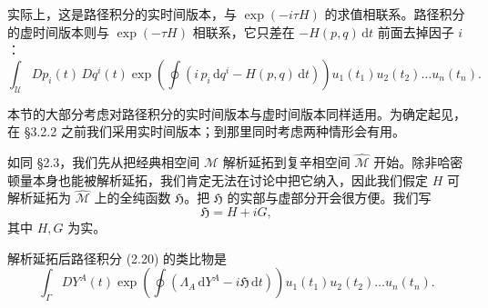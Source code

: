 \documentclass[11pt,a4paper,UTF8]{ctexart}
\theoremstyle{plain}
\theoremstyle{definition}
\begin{document}

实际上，这是路径积分的实时间版本，与 $\exp(-i\tau H)$ 的求值相联系。路径积分的虚时间版本则与 $\exp(-\tau H)$ 相联系，它只差在 $-\!H(p,q)\,\mathrm{d}t$ 前面去掉因子 $i$：
\begin{equation}
    \int_{\mathcal{U}} Dp_i(t)\,Dq^i(t)\exp\left(\oint\left(i\,p_i\,\mathrm{d}q^i-H(p,q)\,\mathrm{d}t\right)\right)u_1(t_1)u_2(t_2)\dots u_n(t_n).
    \tag{3.2}
\end{equation}

本节的大部分考虑对路径积分的实时间版本与虚时间版本同样适用。为确定起见，在 §3.2.2 之前我们采用实时间版本；到那里同时考虑两种情形会有用。

如同 §2.3，我们先从把经典相空间 $\mathcal{M}$ 解析延拓到复辛相空间 $\widehat{\mathcal{M}}$ 开始。除非哈密顿量本身也能被解析延拓，我们肯定无法在讨论中把它纳入，因此我们假定 $H$ 可解析延拓为 $\widehat{\mathcal{M}}$ 上的全纯函数 $\mathfrak{H}$。把 $\mathfrak{H}$ 的实部与虚部分开会很方便。我们写
\begin{equation}
    \mathfrak{H}=H+iG,
    \tag{3.3}
\end{equation}
其中 $H,G$ 为实。


解析延拓后路径积分 (2.20) 的类比物是
\begin{equation}
    \int_{\Gamma}DY^A(t)\exp\left(\oint\left(\Lambda_A\,\mathrm{d}Y^A-i\mathfrak{H}\,\mathrm{d}t\right)\right)u_1(t_1)u_2(t_2)\dots u_n(t_n).
    \tag{3.4}
\end{equation}

\end{document}
